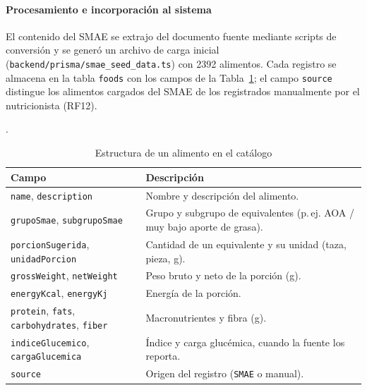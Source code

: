 \paragraph{Procesamiento e incorporación al sistema}

El contenido del SMAE se extrajo del documento fuente mediante scripts de
conversión y se generó un archivo de carga inicial
(\texttt{backend/prisma/smae\_seed\_data.ts}) con 2392 alimentos. Cada registro
se almacena en la tabla \texttt{foods} con los campos de la
Tabla~\ref{tab:campos_food}; el campo \texttt{source} distingue los alimentos
cargados del SMAE de los registrados manualmente por el nutricionista (RF12).

.

\begin{table}[H]
\centering\small
\caption{Estructura de un alimento en el catálogo}\label{tab:campos_food}
\begin{tabularx}{\linewidth}{|p{3.6cm}|X|}
\hline
\textbf{Campo} & \textbf{Descripción} \\ \hline
\texttt{name}, \texttt{description} & Nombre y descripción del alimento. \\ \hline
\texttt{grupoSmae}, \texttt{subgrupoSmae} & Grupo y subgrupo de equivalentes (p.\,ej. AOA / muy bajo aporte de grasa). \\ \hline
\texttt{porcionSugerida}, \texttt{unidadPorcion} & Cantidad de un equivalente y su unidad (taza, pieza, g). \\ \hline
\texttt{grossWeight}, \texttt{netWeight} & Peso bruto y neto de la porción (g). \\ \hline
\texttt{energyKcal}, \texttt{energyKj} & Energía de la porción. \\ \hline
\texttt{protein}, \texttt{fats}, \texttt{carbohydrates}, \texttt{fiber} & Macronutrientes y fibra (g). \\ \hline
\texttt{indiceGlucemico}, \texttt{cargaGlucemica} & Índice y carga glucémica, cuando la fuente los reporta. \\ \hline
\texttt{source} & Origen del registro (\texttt{SMAE} o manual). \\ \hline
\end{tabularx}
\end{table}


